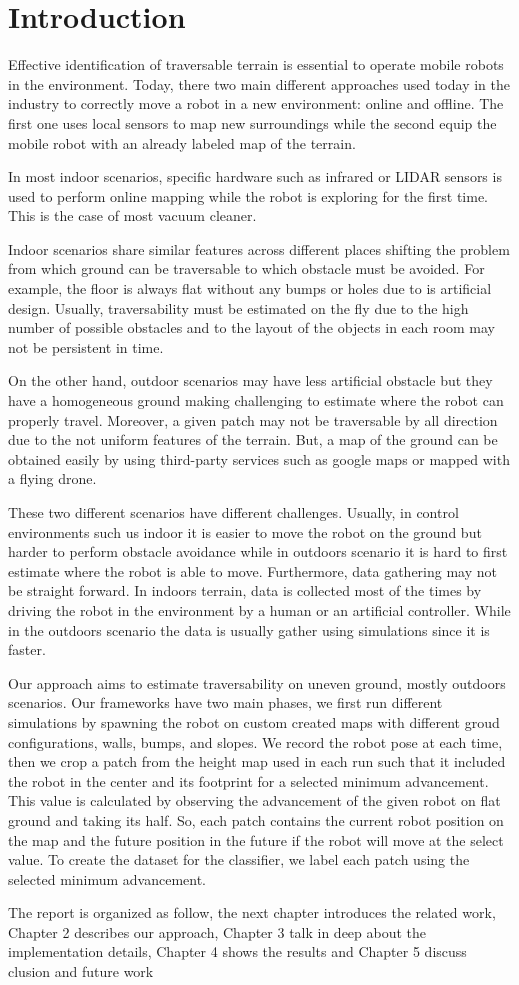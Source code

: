 \documentclass[../document.tex]{subfiles}
\begin{document}
\section{Introduction}
Effective identification of traversable terrain is essential to operate mobile robots in the environment. Today, there two main different approaches
used today in the industry to correctly move a robot in a new environment: online and offline. The first one uses local sensors to map new surroundings while the second
equip the mobile robot with an already labeled map of the terrain.

In most indoor scenarios, specific hardware such as infrared or LIDAR sensors is used to perform online mapping while the robot is exploring for the first time. This is the case of most vacuum cleaner.  

Indoor scenarios share similar features across different places shifting the problem from which ground can be traversable to which obstacle must be avoided.
For example, the floor is always flat without any bumps or holes due to is artificial design. Usually, traversability must be estimated on the fly due to the high number of possible obstacles and to the layout of the objects in each room
may not be persistent in time. 

On the other hand, outdoor scenarios may have less artificial obstacle but they have a homogeneous ground making challenging to estimate where the robot can properly travel. 
Moreover, a given patch may not be traversable by all direction due to the not uniform features of the terrain. But, a map of the ground can be obtained easily by using third-party services such as google maps or mapped with a flying drone. 

These two different scenarios have different challenges. Usually, in control environments such us indoor it is easier to move the robot on the ground but harder to perform obstacle
avoidance while in outdoors scenario it is hard to first estimate where the robot is able to move. 
Furthermore, data gathering may not be straight forward. In indoors terrain, data is collected most of the times by driving the robot in the environment by a human or an artificial
controller. While in the outdoors scenario the data is usually gather using simulations since it is faster. 

Our approach aims to estimate traversability on uneven ground, mostly outdoors scenarios. Our frameworks have two main phases, we first run different simulations by spawning the robot on custom
created maps with different groud configurations, walls, bumps, and slopes. We record the robot pose at each time, then we crop a patch from the height map used in each run such that it included the robot in the center and its footprint for a selected minimum advancement. This value is calculated by observing the advancement of the given robot on flat ground and taking its half. So, each patch contains the current robot position on the map and the future position in the future if the robot will move at the select value. To create the dataset for the classifier, we label each patch using the selected minimum advancement.

The report is organized as follow, the next chapter introduces the related work, Chapter 2 describes our approach, Chapter 3 talk in deep about the implementation details,
Chapter 4 shows the results and Chapter 5 discuss clusion and future work
\end{document}
